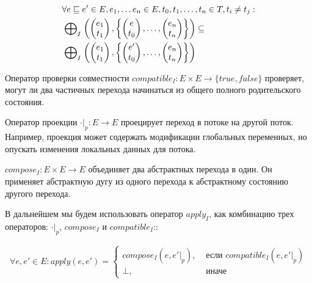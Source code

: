 \begin{equation}
\label{cpa_tm_epp_req_2}
\begin{aligned}
& \forall e \sqsubseteq e' \in E, e_1, \dots e_n \in E, t_0,t_1,\dots,t_n \in T, t_i \neq t_j : \\
& \mathrel{\bigoplus}_I
\left(
\begin{pmatrix}
e_1 \\
t_1 
\end{pmatrix} ,
\left\{
\begin{pmatrix}
e \\
t_0 
\end{pmatrix} ,
\dots ,
\begin{pmatrix}
e_n \\
t_n 
\end{pmatrix}
\right\}
\right)
\subseteq \\
&\mathrel{\bigoplus}_I
\left(
\begin{pmatrix}
e_1 \\
t_1 
\end{pmatrix} ,
\left\{
\begin{pmatrix}
e' \\
t_0 
\end{pmatrix},
\dots ,
\begin{pmatrix}
e_n \\
t_n 
\end{pmatrix}
\right\}
\right)
\end{aligned}
\end{equation}

Оператор проверки совместности $compatible_I: E \times E \rightarrow \{true, false\}$ проверяет, могут ли два частичных перехода начинаться из общего полного родительского состояния. 

Оператор проекции $\cdot|_p: E \rightarrow E$ проецирует переход в потоке на другой поток. Например, проекция может содержать модификации глобальных переменных, но опускать изменения локальных данных для потока.

$compose_I: E \times E \rightarrow E$ объединяет два абстрактных перехода в один. Он применяет абстрактную дугу из одного перехода к абстрактному состоянию другого перехода. 

В дальнейшем мы будем использовать оператор $apply_I$, как комбинацию трех операторов: $\cdot|_p$, $compose_I$ и $compatible_I$::

\begin{equation}
\label{apply_function}
\begin{aligned}
\forall e, e' \in E: apply(e, e') = 
\begin{cases}
compose_{I}(e, e'|_p), &\mbox{ если } compatible_I(e, e'|_p) \\
\bot, & \mbox{ иначе}
\end{cases}
\end{aligned}
\end{equation}


